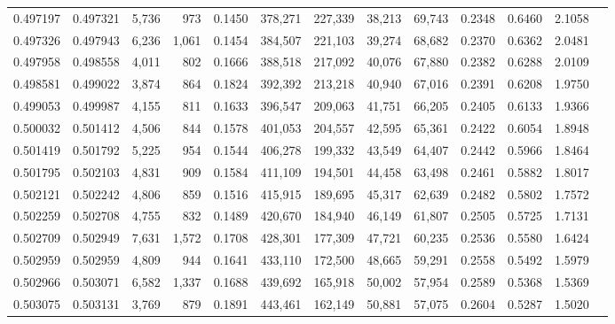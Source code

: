 \begin{tabular}{rrrrrrrrrrrrr}
0.497197 & 0.497321 &  5,736 &   973 &                                     0.1450 & 378,271 & 227,339 &  38,213 &  69,743 & 0.2348 & 0.6460 & 2.1058 \\
0.497326 & 0.497943 &  6,236 & 1,061 &                                     0.1454 & 384,507 & 221,103 &  39,274 &  68,682 & 0.2370 & 0.6362 & 2.0481 \\
0.497958 & 0.498558 &  4,011 &   802 &                                     0.1666 & 388,518 & 217,092 &  40,076 &  67,880 & 0.2382 & 0.6288 & 2.0109 \\
0.498581 & 0.499022 &  3,874 &   864 &                                     0.1824 & 392,392 & 213,218 &  40,940 &  67,016 & 0.2391 & 0.6208 & 1.9750 \\
0.499053 & 0.499987 &  4,155 &   811 &                                     0.1633 & 396,547 & 209,063 &  41,751 &  66,205 & 0.2405 & 0.6133 & 1.9366 \\
0.500032 & 0.501412 &  4,506 &   844 &                                     0.1578 & 401,053 & 204,557 &  42,595 &  65,361 & 0.2422 & 0.6054 & 1.8948 \\
0.501419 & 0.501792 &  5,225 &   954 &                                     0.1544 & 406,278 & 199,332 &  43,549 &  64,407 & 0.2442 & 0.5966 & 1.8464 \\
0.501795 & 0.502103 &  4,831 &   909 &                                     0.1584 & 411,109 & 194,501 &  44,458 &  63,498 & 0.2461 & 0.5882 & 1.8017 \\
0.502121 & 0.502242 &  4,806 &   859 &                                     0.1516 & 415,915 & 189,695 &  45,317 &  62,639 & 0.2482 & 0.5802 & 1.7572 \\
0.502259 & 0.502708 &  4,755 &   832 &                                     0.1489 & 420,670 & 184,940 &  46,149 &  61,807 & 0.2505 & 0.5725 & 1.7131 \\
0.502709 & 0.502949 &  7,631 & 1,572 &                                     0.1708 & 428,301 & 177,309 &  47,721 &  60,235 & 0.2536 & 0.5580 & 1.6424 \\
0.502959 & 0.502959 &  4,809 &   944 &                                     0.1641 & 433,110 & 172,500 &  48,665 &  59,291 & 0.2558 & 0.5492 & 1.5979 \\
0.502966 & 0.503071 &  6,582 & 1,337 &                                     0.1688 & 439,692 & 165,918 &  50,002 &  57,954 & 0.2589 & 0.5368 & 1.5369 \\
0.503075 & 0.503131 &  3,769 &   879 &                                     0.1891 & 443,461 & 162,149 &  50,881 &  57,075 & 0.2604 & 0.5287 & 1.5020 \\

\end{tabular}
